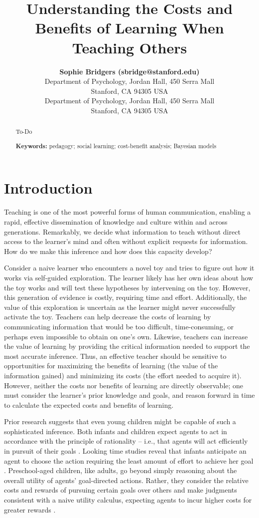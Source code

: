 \documentclass[10pt,letterpaper]{article}
\title{Understanding the Costs and Benefits of Learning When Teaching Others}
\author{{\large \bf Sophie Bridgers (sbridge@stanford.edu)} \\
  Department of Psychology, Jordan Hall, 450 Serra Mall \\
 Stanford, CA 94305 USA
  \AND {\large \bf Emily Tang (emjtang@stanford.edu)} \\
   Department of Psychology, Jordan Hall, 450 Serra Mall \\
 Stanford, CA 94305 USA}
\begin{document}
\maketitle


\begin{abstract}
To-Do

\textbf{Keywords:} 
pedagogy; social learning; cost-benefit analysis; Bayesian models
\end{abstract}


\section{Introduction}

Teaching is one of the most powerful forms of human communication, enabling a rapid, effective dissemination of knowledge and culture within and across generations. Remarkably, we decide what information to teach without direct access to the learner's mind and often without explicit requests for information. How do we make this inference and how does this capacity develop? 

Consider a naive learner who encounters a novel toy and tries to figure out how it works via self-guided exploration. The learner likely has her own ideas about how the toy works and will test these hypotheses by intervening on the toy. However, this generation of evidence is costly, requiring time and effort. Additionally, the value of this exploration is uncertain as the learner might never successfully activate the toy. Teachers can help decrease the costs of learning by communicating information that would be too difficult, time-consuming, or perhaps even impossible to obtain on one's own. Likewise, teachers can increase the value of learning by providing the critical information needed to support the most accurate inference. Thus, an effective teacher should be sensitive to opportunities for maximizing the benefits of learning (the value of the information gained) and minimizing its costs (the effort needed to acquire it). However, neither the costs nor benefits of learning are directly observable; one must consider the learner's prior knowledge and goals, and reason forward in time to calculate the expected costs and benefits of learning.



Prior research suggests that even young children might be capable of such a sophisticated inference. Both infants and children expect agents to act in accordance with the principle of rationality -- i.e., that agents will act efficiently in pursuit of their goals \cite{Baker2009}. 
Looking time studies reveal that infants anticipate an agent to choose the action requiring the least amount of effort to achieve her goal \cite{Scott2013}.
Preschool-aged children, like adults, go beyond simply reasoning about the overall utility of agents' goal-directed actions. 
Rather, they consider the relative costs and rewards of pursuing certain goals over others and make judgments consistent with a naive utility calculus, expecting agents to incur higher costs for greater rewards \cite{JaraEttinger2015}.
\end{document}
